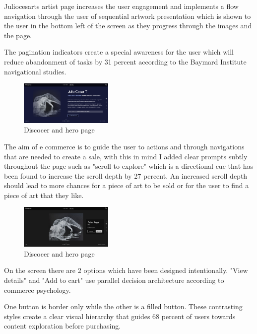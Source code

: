 \documentclass[]{project_final}
\begin{document}
Juliocesarts artist page increases the user engagement and implements a flow navigation through the user of sequential artwork presentation which is shown to the user in the bottom left of the screen as they progress through the images and the page.

The pagination indicators create a special awareness for the user which will reduce abandonment of tasks by 31 percent according to the Baymard Institute navigational studies.

\begin{figure}[ht!]
    \centering
    \includegraphics[width=0.4\textwidth]{AG17.png}
    \vspace*{0.0cm}
    \caption{Discocer and hero page}
    \label{fig:1}
\end{figure}

The aim of e commerce is to guide the user to actions and through navigations that are needed to create a sale, with this in mind I added clear prompts subtly throughout the page such as "scroll to explore" which is a directional cue that has been found to increase the scroll depth by 27 percent. An increased scroll depth should lead to more chances for a piece of art to be sold or for the user to find a piece of art that they like.

\begin{figure}[ht!]
    \centering
    \includegraphics[width=0.4\textwidth]{AG18.png}
    \vspace*{0.0cm}
    \caption{Discocer and hero page}
    \label{fig:1}
\end{figure}

On the screen there are 2 options which have been designed intentionally. "View details" and "Add to cart" use parallel decision architecture according to commerce psychology.

One button is border only while the other is a filled button. These contrasting styles create a clear visual hierarchy that guides 68 percent of users towards content exploration before purchasing.
\end{document}
